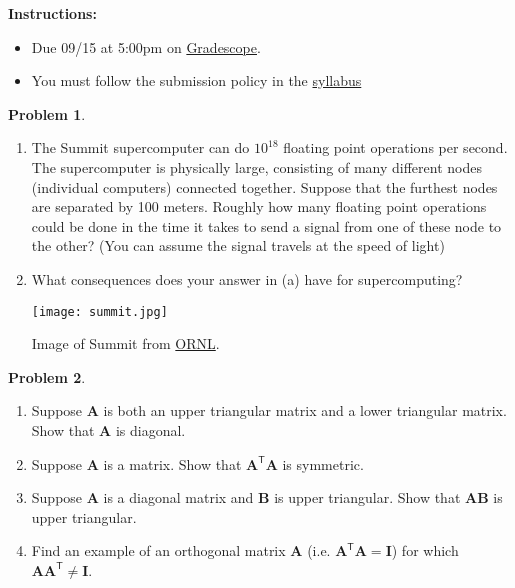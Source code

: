 \documentclass[12pt]{article}
\theoremstyle{definition}
\newtheorem{problem}{Problem}
\renewcommand{\vec}{\mathbf}
\newcommand{\T}{\mathsf{T}}
\begin{document}
\textbf{\Large{}}
    
    \vspace{-1.8em}
    \hrulefill
 
\textbf{Instructions:}
    \begin{itemize}
        \item Due 09/15 at 5:00pm on \href{https://www.gradescope.com/courses/570477/}{Gradescope}.
        \item You must follow the submission policy in the \href{https://courses.chen.pw/na_f2023/syllabus.html}{syllabus} 
\end{itemize}
   
\vspace{1em}

\begin{problem}~
    \begin{enumerate}
        \item The Summit supercomputer can do $10^{18}$ floating point operations per second.
            The supercomputer is physically large, consisting of many different nodes (individual computers) connected together. 
            Suppose that the furthest nodes are separated by 100 meters.
            Roughly how many floating point operations could be done in the time it takes to send a signal from one of these node to the other? (You can assume the signal travels at the speed of light)
        \item What consequences does your answer in (a) have for supercomputing?
            \begin{center}
                \texttt{[image: summit.jpg]}
                
                Image of Summit from \href{https://www.flickr.com/photos/olcf/49912253043/in/album-72157683655708262/}{ORNL}.
            \end{center}
    \end{enumerate}
\end{problem}

\vfill
\begin{problem}~
    \begin{enumerate}
        \item Suppose $\vec{A}$ is both an upper triangular matrix and a lower triangular matrix. Show that $\vec{A}$ is diagonal.
        \item Suppose $\vec{A}$ is a matrix. Show that $\vec{A}^\T \vec{A}$ is symmetric.
        \item Suppose $\vec{A}$ is a diagonal matrix and $\vec{B}$ is upper triangular. Show that $\vec{A}\vec{B}$ is upper triangular.
        \item Find an example of an orthogonal matrix $\vec{A}$ (i.e. $\vec{A}^\T \vec{A} = \vec{I}$) for which $\vec{A}\vec{A}^\T \neq \vec{I}$. 
    \end{enumerate}
\end{problem}
\end{document}
